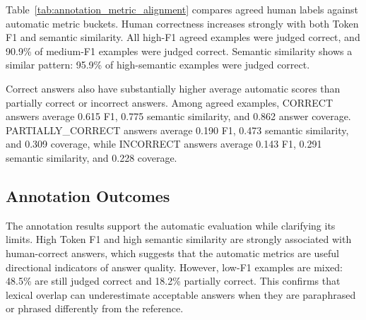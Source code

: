 \documentclass[11pt]{article}
\begin{document}
Table~\ref{tab:annotation_metric_alignment} compares agreed human labels against automatic metric buckets. Human correctness increases strongly with both Token F1 and semantic similarity. All high-F1 agreed examples were judged correct, and 90.9\% of medium-F1 examples were judged correct. Semantic similarity shows a similar pattern: 95.9\% of high-semantic examples were judged correct.

\begin{table}[t]
\centering
\small
\setlength{\tabcolsep}{4pt}
\caption{Alignment between automatic metric buckets and agreed human labels. Percentages are computed within each bucket.}
\label{tab:annotation_metric_alignment}
\end{table}

Correct answers also have substantially higher average automatic scores than partially correct or incorrect answers. Among agreed examples, CORRECT answers average 0.615 F1, 0.775 semantic similarity, and 0.862 answer coverage. PARTIALLY\_CORRECT answers average 0.190 F1, 0.473 semantic similarity, and 0.309 coverage, while INCORRECT answers average 0.143 F1, 0.291 semantic similarity, and 0.228 coverage.

\subsection{Annotation Outcomes}

The annotation results support the automatic evaluation while clarifying its limits. High Token F1 and high semantic similarity are strongly associated with human-correct answers, which suggests that the automatic metrics are useful directional indicators of answer quality. However, low-F1 examples are mixed: 48.5\% are still judged correct and 18.2\% partially correct. This confirms that lexical overlap can underestimate acceptable answers when they are paraphrased or phrased differently from the reference.
\end{document}
